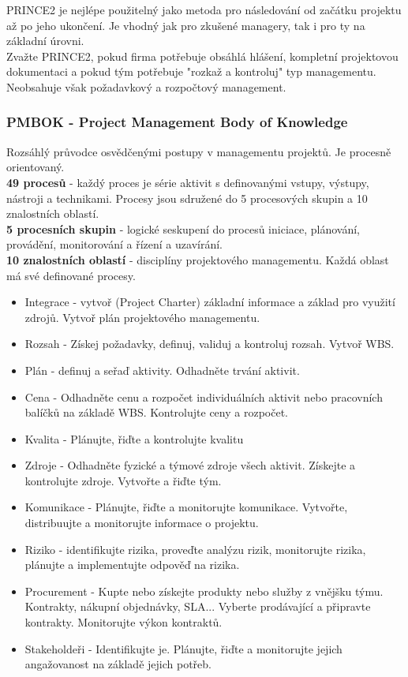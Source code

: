 \documentclass[11pt,a4paper]{article}
\begin{document}
        PRINCE2 je nejlépe použitelný jako metoda pro následování od začátku projektu až po jeho ukončení. Je vhodný jak pro zkušené managery, tak i pro ty na základní úrovni.\\
        Zvažte PRINCE2, pokud firma potřebuje obsáhlá hlášení, kompletní projektovou dokumentaci a pokud tým potřebuje "rozkaž a kontroluj" typ managementu. Neobsahuje však požadavkový a rozpočtový management.
    \subsubsection{PMBOK - Project Management Body of Knowledge}
        Rozsáhlý průvodce osvědčenými postupy v managementu projektů. Je procesně orientovaný.\\
        \textbf{49 procesů} - každý proces je série aktivit s definovanými vstupy, výstupy, nástroji a technikami. Procesy jsou sdružené do 5 procesových skupin a 10 znalostních oblastí.\\
        \textbf{5 procesních skupin} - logické seskupení do procesů iniciace, plánování, provádění, monitorování a řízení a uzavírání.\\
        \textbf{10 znalostních oblastí} - disciplíny projektového managementu. Každá oblast má své definované procesy.
        \begin{itemize}
            \item Integrace - vytvoř (Project Charter) základní informace a základ pro využití zdrojů. Vytvoř plán projektového managementu.
            \item Rozsah - Získej požadavky, definuj, validuj a kontroluj rozsah. Vytvoř WBS.
            \item Plán - definuj a seřaď aktivity. Odhadněte trvání aktivit.
            \item Cena - Odhadněte cenu a rozpočet individuálních aktivit nebo pracovních balíčků na základě WBS. Kontrolujte ceny a rozpočet.
            \item Kvalita - Plánujte, řiďte a kontrolujte kvalitu
            \item Zdroje - Odhadněte fyzické a týmové zdroje všech aktivit. Získejte a kontrolujte zdroje. Vytvořte a řiďte tým.
            \item Komunikace - Plánujte, řiďte a monitorujte komunikace. Vytvořte, distribuujte a monitorujte informace o projektu.
            \item Riziko - identifikujte rizika, proveďte analýzu rizik, monitorujte rizika, plánujte a implementujte odpověď na rizika.
            \item Procurement - Kupte nebo získejte produkty nebo služby z vnějšku týmu. Kontrakty, nákupní objednávky, SLA... Vyberte prodávající a připravte kontrakty. Monitorujte výkon kontraktů.
            \item Stakeholdeři - Identifikujte je. Plánujte, řiďte a monitorujte jejich angažovanost na základě jejich potřeb.
        \end{itemize}
\end{document}
